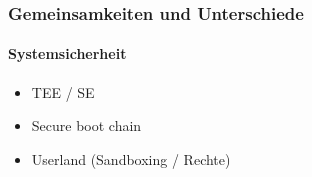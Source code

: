 \begin{frame}
\frametitle{Gemeinsamkeiten und Unterschiede}
\framesubtitle{Systemsicherheit}

\begin{itemize}
  \item TEE / SE
  \item Secure boot chain
  \item Userland (Sandboxing / Rechte)
\end{itemize}
\end{frame}
